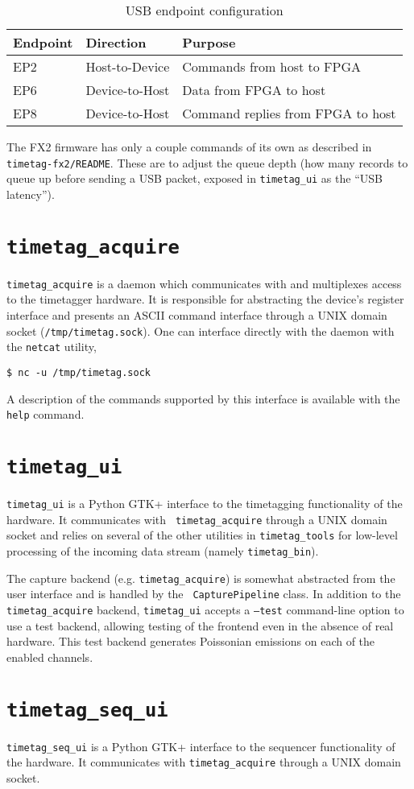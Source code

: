 \begin{table}
  \begin{tabular}{|lll|}
    \hline
    Endpoint & Direction      & Purpose \\
    \hline
    EP2      & Host-to-Device & Commands from host to FPGA \\
    EP6      & Device-to-Host & Data from FPGA to host \\
    EP8      & Device-to-Host & Command replies from FPGA to host \\
    \hline
  \end{tabular}
  \caption{USB endpoint configuration}
  \label{Table:Endpoints}
\end{table}

The FX2 firmware has only a couple commands of its own as described in
{\tt timetag-fx2/README}. These are to adjust the queue depth (how
many records to queue up before sending a USB packet, exposed in
{\tt timetag\_ui} as the ``USB latency'').

\section{\tt timetag\_acquire}
{\tt timetag\_acquire} is a daemon which communicates with and
multiplexes access to the timetagger hardware. It is responsible for
abstracting the device's register interface and presents an ASCII
command interface through a UNIX domain socket
({\tt /tmp/timetag.sock}). One can interface directly with the daemon
with the {\tt netcat} utility,

\begin{verbatim}
$ nc -u /tmp/timetag.sock
\end{verbatim}

A description of the commands supported by this interface is available
with the {\tt help} command.

\section{\tt timetag\_ui}

{\tt timetag\_ui} is a Python GTK+ interface to the timetagging
functionality of the hardware. It communicates with {\tt
timetag\_acquire} through a UNIX domain socket and relies on several
of the other utilities in {\tt timetag\_tools} for low-level
processing of the incoming data stream (namely {\tt timetag\_bin}).

The capture backend (e.g. {\tt timetag\_acquire}) is somewhat
abstracted from the user interface and is handled by the {\tt
CapturePipeline} class.
In addition to the {\tt timetag\_acquire} backend, {\tt timetag\_ui}
accepts a {\tt --test} command-line option to use a test backend,
allowing testing of the frontend even in the absence of real
hardware. This test backend generates Poissonian emissions on each of
the enabled channels.

\section{\tt timetag\_seq\_ui}
{\tt timetag\_seq\_ui} is a Python GTK+ interface to the sequencer
functionality of the hardware. It communicates with
{\tt timetag\_acquire} through a UNIX domain socket.

